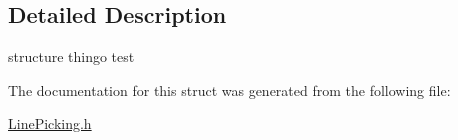 \subsection{Detailed Description}
structure thingo test 

The documentation for this struct was generated from the following file\-:\begin{DoxyCompactItemize}
\item 
\hyperlink{_line_picking_8h}{Line\-Picking.\-h}\end{DoxyCompactItemize}
